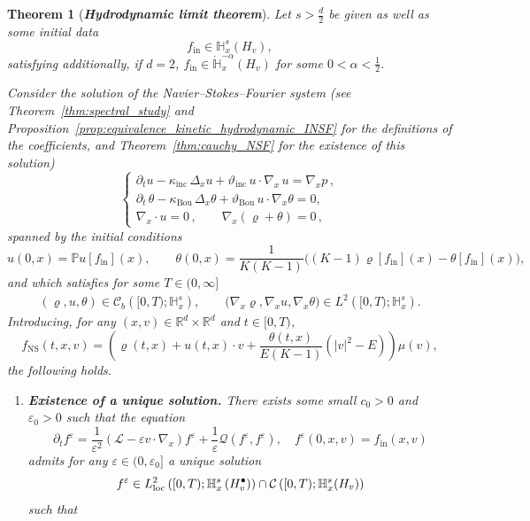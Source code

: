 \documentclass[10pt]{amsart}
\newtheorem{theo}{Theorem}[section]
\theoremstyle{definition}\newtheorem{defi}[theo]{Definition}\newtheorem{rema}[theo]{Remark}\newtheorem{exam}[theo]{Example}\newtheorem{exem}[theo]{Example}\newtheorem{nota}[theo]{Notation}
\newcommand{\ini}{\mathrm{in}}
\newcommand{\ns}{\mathrm{NS}}
\newcommand{\Inc}{\mathrm{inc}}
\newcommand{\Bou}{\mathrm{Bou}}
\newcommand{\R}{\mathbb{R}}
\newcommand{\bbH}{\mathbb{H}}
\newcommand{\bbP}{\mathbb{P}}
\newcommand{\CC}{\mathcal{C}}
\newcommand{\LL}{\mathcal{L}}
\newcommand{\QQ}{\mathcal{Q}}
\newcommand{\Ss}{H}
\newcommand{\Ssp}{H^{\bullet}}
\newcommand*\eps{{\varepsilon}}
\newcommand*{\relabel}{\renewcommand{\labelenumi}{(\theenumi)}}
\newcommand*{\bfenumi}{\renewcommand*{\theenumi}{\textit{\textbf{\arabic{enumi}}}}\relabel}
\begin{document}
\begin{theo}[\emph{\textbf{Hydrodynamic limit theorem}}]\label{thm:hydrodynamic_limit}
Let $s > \frac{d}{2}$ be given as well as some initial data
\[
f_\ini \in\bbH^s_x \left(\Ss_v \right),
\]
satisfying additionally, if $d=2$, $f_\ini \in \dot{\bbH}^{-\alpha}_x (\Ss_v)$ for some $0 < \alpha < \frac{1}{2}.$

Consider the solution of the Navier--Stokes--Fourier system (see Theorem~\ref{thm:spectral_study} and Proposition~\ref{prop:equivalence_kinetic_hydrodynamic_INSF} for the definitions of the coefficients, {and Theorem~\ref{thm:cauchy_NSF} for the existence of this solution})
\begin{equation}\label{eq:main-NSF}
\begin{cases}
\partial_{t}u-\kappa_{\Inc}\,\Delta_{x}u + \vartheta_{\Inc}\,u\cdot \nabla_{x}\,u= \nabla_{x}p\,,\\[6pt]
\partial_{t}\,\theta-\kappa_{\Bou}\,\Delta_{x}\theta +\vartheta_{\Bou}\,u\cdot \nabla_{x}\theta=0,\\[8pt]
\nabla_{x}\cdot u=0\,, \qquad \nabla_{x}\left(\varrho + \theta\right)= 0\,,
\end{cases}
\end{equation}
spanned by the initial conditions
\[
u(0, x) = \bbP u[f_\ini](x), \qquad \theta(0, x) = \frac{1}{K(K-1)}\big((K-1) \varrho[f_\ini](x) - \theta[f_\ini](x) \big),
\]
and which satisfies for some $T \in (0, \infty]$
\begin{gather*}
(\varrho, u, \theta) \in \CC_b\left([0, T) ;\bbH^s_x \right), \qquad \big(\nabla_x \varrho, \nabla_x u, \nabla_x \theta\big) \in L^2\left([0, T) ;\bbH^s_x \right).
\end{gather*}
Introducing, for any $(x,v) \in \R^{d}\times\R^{d}$ and $t \in [0,T)$,
\[
f_\ns(t, x, v) = \left(\varrho(t, x) + u(t, x) \cdot v + \frac{\theta(t, x)}{E(K-1)} \left(|v|^2 - E \right)\right) \mu(v),
\]
the following holds.
\begin{enumerate}\bfenumi
\item\label{theo1.12.1} \textit{\textbf{Existence of a unique solution.}} There exists some small $c_0 > 0$ and $\eps_0 > 0$ such that the equation
\[
\partial_t f^\eps = \frac{1}{\eps^2} \left(\LL - \eps v \cdot \nabla_x \right) f^\eps + \frac{1}{\eps} \QQ\left(f^\eps, f^\eps \right), \quad f^\eps(0, x, v) = f_\ini(x, v)
\]
admits for any $\eps \in (0, \eps_0]$ a unique solution
\[
f^\eps \in L^2_{\rm{loc}} \left([0, T) ; \bbH^s_x \left(\Ssp_v\right) \right) \cap \CC\left([0,T);\bbH^s_x(\Ss_v)\right)
\]
such that

\end{enumerate}
\end{theo}
\end{document}
